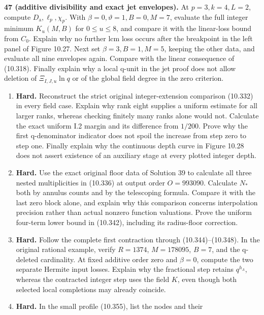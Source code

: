 \documentclass[
  11pt,
  a4paper,
]{article}
\begin{document}
\textbf{47 (additive divisibility and exact jet envelopes).} At
\(p=3,k=4,L=2\), compute \(D_{\mathrm a},\ell_p,\chi_p\). With
\(\beta=0,\vartheta=1,B=0,M=7\), evaluate the full integer minimum
\(K_u(M,B)\) for \(0\le u\le8\), and compare it with the linear-loss
bound from \(C_0\). Explain why no further lcm loss occurs after the
breakpoint in the left panel of Figure 10.27. Next set
\(\beta=3,B=1,M=5\), keeping the other data, and evaluate all nine
envelopes again. Compare with the linear consequence of (10.318).
Finally explain why a local q-unit in the jet proof does not allow
deletion of \(\Xi_{I,J,u}\ln q\) or of the global field degree in the
zero criterion.

\begin{enumerate}
\def\labelenumi{\arabic{enumi}.}
\setcounter{enumi}{47}
\item
  \textbf{Hard.} Reconstruct the strict original integer-extension
  comparison (10.332) in every field case. Explain why rank eight
  supplies a uniform estimate for all larger ranks, whereas checking
  finitely many ranks alone would not. Calculate the exact uniform I.2
  margin and its difference from \(1/200\). Prove why the first
  q-denominator indicator does not spoil the increase from step zero to
  step one. Finally explain why the continuous depth curve in Figure
  10.28 does not assert existence of an auxiliary stage at every plotted
  integer depth.
\item
  \textbf{Hard.} Use the exact original floor data of Solution 39 to
  calculate all three nested multiplicities in (10.336) at output order
  \(O=993090\). Calculate \(N_*\) both by annulus counts and by the
  telescoping formula. Compare it with the last zero block alone, and
  explain why this comparison concerns interpolation precision rather
  than actual nonzero function valuations. Prove the uniform four-term
  lower bound in (10.342), including its radius-floor correction.
\item
  \textbf{Hard.} Follow the complete first contraction through
  (10.344)--(10.348). In the original rational example, verify
  \(R=1374\), \(M=178095\), \(B=7\), and the q-deleted cardinality. At
  fixed additive order zero and \(\beta=0\), compute the two separate
  Hermite input losses. Explain why the fractional step retains
  \(q^{h_\Lambda}\), whereas the contracted integer step uses the field
  \(K\), even though both selected local completions may already
  coincide.
\item
  \textbf{Hard.} In the small profile (10.355), list the nodes and their

\end{enumerate}
\end{document}
